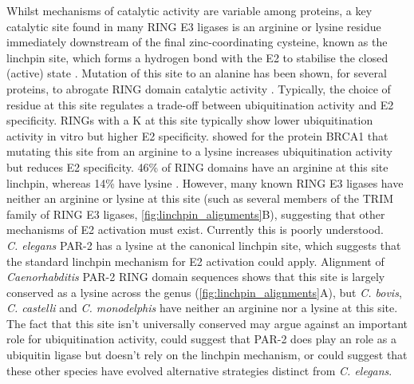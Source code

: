 \documentclass[12pt]{"report"}
\begin{document}
Whilst mechanisms of catalytic activity are variable among proteins, a key catalytic site found in many RING E3 ligases is an arginine or lysine residue immediately downstream of the final zinc-coordinating cysteine, known as the linchpin site, which forms a hydrogen bond with the E2 to stabilise the closed (active) state \citep{Pruneda2012}. Mutation of this site to an alanine has been shown, for several proteins, to abrogate RING domain catalytic activity \citep{Pruneda2012}. Typically, the choice of residue at this site regulates a trade-off between ubiquitination activity and E2 specificity. RINGs with a K at this site typically show lower ubiquitination activity in vitro but higher E2 specificity. \textcite{Stewart2017} showed for the protein BRCA1 that mutating this site from an arginine to a lysine increases ubiquitination activity but reduces E2 specificity. 46\% of RING domains have an arginine at this site linchpin, whereas 14\% have lysine \citep{Stewart2017}. However, many known RING E3 ligases have neither an arginine or lysine at this site (such as several members of the TRIM family of RING E3 ligases, \cref{fig:linchpin_alignments}B), suggesting that other mechanisms of E2 activation must exist. Currently this is poorly understood.\\

\textit{C. elegans} PAR-2 has a lysine at the canonical linchpin site, which suggests that the standard linchpin mechanism for E2 activation could apply. Alignment of \textit{Caenorhabditis} PAR-2 RING domain sequences shows that this site is largely conserved as a lysine across the genus (\cref{fig:linchpin_alignments}A), but \textit{C. bovis}, \textit{C. castelli} and \textit{C. monodelphis} have neither an arginine nor a lysine at this site. The fact that this site isn't universally conserved may argue against an important role for ubiquitination activity, could suggest that PAR-2 does play an role as a ubiquitin ligase but doesn't rely on the linchpin mechanism, or could suggest that these other species have evolved alternative strategies distinct from \textit{C. elegans}.\\ 
\end{document}
